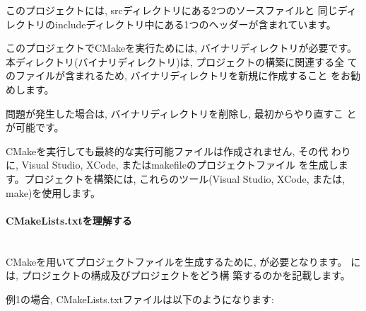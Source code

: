 \documentclass[uplatex,11pt,a4paper,landscape,dvipdfmx]{jsarticle} %
\newcommand{\sectiontitle}[1]{\paragraph{#1} \ \\} %
\begin{document}
\begin{multicols}{2}
\vspace{\baselineskip} %




このプロジェクトには, srcディレクトリにある2つのソースファイルと
同じディレクトリのincludeディレクトリ中にある1つのヘッダーが含まれています。

このプロジェクトでCMakeを実行ためには, バイナリディレクトリが必要です。
本ディレクトリ(バイナリディレクトリ)は, プロジェクトの構築に関連する全
てのファイルが含まれるため, バイナリディレクトリを新規に作成すること
をお勧めします。 

問題が発生した場合は, バイナリディレクトリを削除し, 最初からやり直すこ
とが可能です。

CMakeを実行しても最終的な実行可能ファイルは作成されません, その代
わりに, Visual Studio, XCode, またはmakefileのプロジェクトファイル
を生成します。プロジェクトを構築には, これらのツール(Visual Studio, 
XCode, または, make)を使用します。 

\sectiontitle{CMakeLists.txtを理解する}

CMakeを用いてプロジェクトファイルを生成するために,
が必要となります。
には, プロジェクトの構成及びプロジェクトをどう構
築するのかを記載します。

例1の場合, CMakeLists.txtファイルは以下のようになります: 





\end{multicols}
\end{document}
